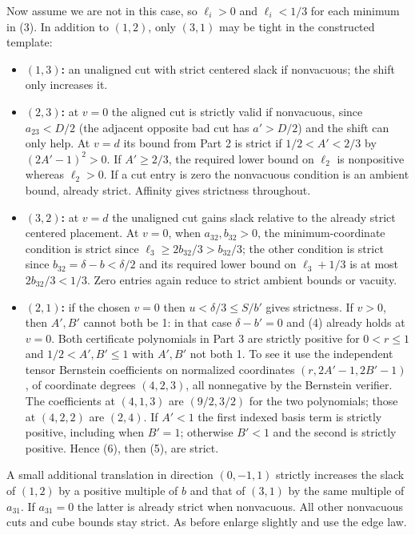 \documentclass[
  10pt,
]{article}
\providecommand{\tightlist}{%
  \setlength{\itemsep}{0pt}\setlength{\parskip}{0pt}}
\begin{document}
Now assume we are not in this case, so \(\ell_i>0\) and \(\ell_i<1/3\)
for each minimum in (3). In addition to \((1,2)\), only \((3,1)\) may be
tight in the constructed template:

\begin{itemize}
\tightlist
\item
  \textbf{\((1,3)\):} an unaligned cut with strict centered slack if
  nonvacuous; the shift only increases it.
\item
  \textbf{\((2,3)\):} at \(v=0\) the aligned cut is strictly valid if
  nonvacuous, since \(a_{23}<D/2\) (the adjacent opposite bad cut has
  \(a'>D/2\)) and the shift can only help. At \(v=d\) its bound from
  Part 2 is strict if \(1/2<A'<2/3\) by \((2A'-1)^2>0\). If
  \(A'\ge2/3\), the required lower bound on \(\ell_2\) is nonpositive
  whereas \(\ell_2>0\). If a cut entry is zero the nonvacuous condition
  is an ambient bound, already strict. Affinity gives strictness
  throughout.
\item
  \textbf{\((3,2)\):} at \(v=d\) the unaligned cut gains slack relative
  to the already strict centered placement. At \(v=0\), when
  \(a_{32},b_{32}>0\), the minimum-coordinate condition is strict since
  \(\ell_3\ge2b_{32}/3>b_{32}/3\); the other condition is strict since
  \(b_{32}=\delta-b<\delta/2\) and its required lower bound on
  \(\ell_3+1/3\) is at most \(2b_{32}/3<1/3\). Zero entries again reduce
  to strict ambient bounds or vacuity.
\item
  \textbf{\((2,1)\):} if the chosen \(v=0\) then \(u<\delta/3\le S/b'\)
  gives strictness. If \(v>0\), then \(A',B'\) cannot both be 1: in that
  case \(\delta-b'=0\) and (4) already holds at \(v=0\). Both
  certificate polynomials in Part 3 are strictly positive for
  \(0<r\le1\) and \(1/2<A',B'\le1\) with \(A',B'\) not both 1. To see it
  use the independent tensor Bernstein coefficients on normalized
  coordinates \((r,2A'-1,2B'-1)\), of coordinate degrees \((4,2,3)\),
  all nonnegative by the Bernstein verifier. The coefficients at
  \((4,1,3)\) are \((9/2,3/2)\) for the two polynomials; those at
  \((4,2,2)\) are \((2,4)\). If \(A'<1\) the first indexed basis term is
  strictly positive, including when \(B'=1\); otherwise \(B'<1\) and the
  second is strictly positive. Hence (6), then (5), are strict.
\end{itemize}

A small additional translation in direction \((0,-1,1)\) strictly
increases the slack of \((1,2)\) by a positive multiple of \(b\) and
that of \((3,1)\) by the same multiple of \(a_{31}\). If \(a_{31}=0\)
the latter is already strict when nonvacuous. All other nonvacuous cuts
and cube bounds stay strict. As before enlarge slightly and use the edge
law.
\end{document}
